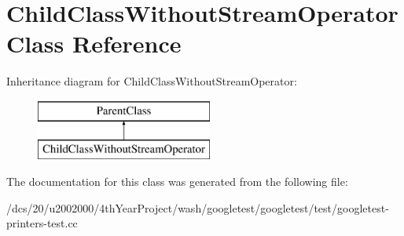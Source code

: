 \hypertarget{classChildClassWithoutStreamOperator}{}\section{Child\+Class\+Without\+Stream\+Operator Class Reference}
\label{classChildClassWithoutStreamOperator}
Inheritance diagram for Child\+Class\+Without\+Stream\+Operator\+:\begin{figure}[H]
\begin{center}
\leavevmode
\includegraphics[height=2.000000cm]{classChildClassWithoutStreamOperator}
\end{center}
\end{figure}


The documentation for this class was generated from the following file\+:\begin{DoxyCompactItemize}
\item 
/dcs/20/u2002000/4th\+Year\+Project/wash/googletest/googletest/test/googletest-\/printers-\/test.\+cc\end{DoxyCompactItemize}
